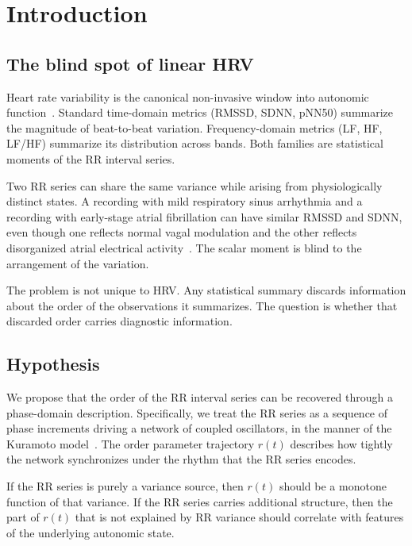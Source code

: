 \documentclass[11pt]{article}
\begin{document}
\tableofcontents

\section{Introduction}

\subsection{The blind spot of linear HRV}

Heart rate variability is the canonical non-invasive window into
autonomic function~\cite{taskforce1996}. Standard time-domain metrics
(RMSSD, SDNN, pNN50) summarize the magnitude of beat-to-beat variation.
Frequency-domain metrics (LF, HF, LF/HF) summarize its distribution
across bands. Both families are statistical moments of the RR interval
series.

Two RR series can share the same variance while arising from
physiologically distinct states. A recording with mild respiratory
sinus arrhythmia and a recording with early-stage atrial fibrillation
can have similar RMSSD and SDNN, even though one reflects normal vagal
modulation and the other reflects disorganized atrial electrical
activity~\cite{calkins2017}. The scalar moment is blind to the
arrangement of the variation.

The problem is not unique to HRV. Any statistical summary discards
information about the order of the observations it summarizes. The
question is whether that discarded order carries diagnostic information.

\subsection{Hypothesis}

We propose that the order of the RR interval series can be recovered
through a phase-domain description. Specifically, we treat the RR
series as a sequence of phase increments driving a network of coupled
oscillators, in the manner of the Kuramoto
model~\cite{kuramoto1975,acebron2005}. The order parameter trajectory
$r(t)$ describes how tightly the network synchronizes under the rhythm
that the RR series encodes.

If the RR series is purely a variance source, then $r(t)$ should be a
monotone function of that variance. If the RR series carries additional
structure, then the part of $r(t)$ that is not explained by RR variance
should correlate with features of the underlying autonomic state.
\end{document}
